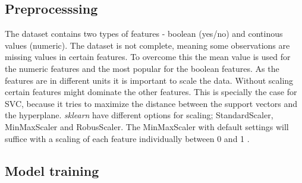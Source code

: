 \subsection*{Preprocesssing}
The dataset contains two types of features - boolean (yes/no) and continous values (numeric). The dataset is not complete, meaning some observations are missing values in certain features. To overcome this the mean value is used for the numeric features and the most popular for the boolean features. As the features are in different units it is important to scale the data. Without scaling certain features might dominate the other features. This is specially the case for SVC, because it tries to maximize the distance between the support vectors and the hyperplane. \textit{sklearn} have different options for scaling; StandardScaler, MinMaxScaler and RobusScaler. The MinMaxScaler with default settings will suffice with a scaling of each feature individually between 0 and 1 .        

\subsection*{Model training}
